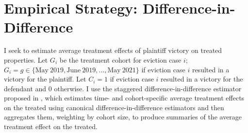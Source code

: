 \documentclass[12pt]{article}
\begin{document}
\section{Empirical Strategy: Difference-in-Difference}
    I seek to estimate average treatment effects of plaintiff victory on treated properties. Let $G_i$ be the treatment cohort for eviction case $i$; $G_i = g \in \{\text{May}\:2019, \text{June}\:2019, ..., \text{May}\:2021\}$ if eviction case $i$ resulted in a victory for the plaintiff. Let $C_i = 1$ if eviction case $i$ resulted in a victory for the defendant and $0$ otherwise. I use  the staggered difference-in-difference estimator proposed in \cite{callaway_sant'anna_2021}, which estimates time- and cohort-specific average treatment effects on the treated using canonical difference-in-difference estimators and then aggregates them, weighting by cohort size, to produce summaries of the average treatment effect on the treated.
\end{document}
